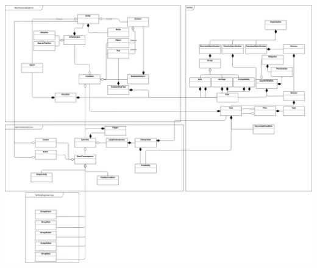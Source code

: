 \documentclass[a0,portrait]{a0poster}
\begin{document}
\begin{center}\vspace{1cm} 
		\label{figUmlModelSimulation}
		\includegraphics[width=0.65\linewidth]{uml_model_simulation}
\end{center}\vspace{1cm} 
\end{document}
